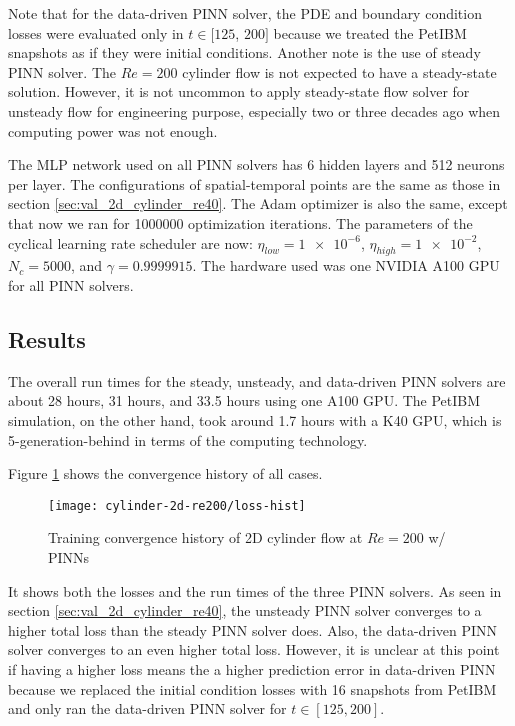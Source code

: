 Note that for the data-driven PINN solver, the PDE and boundary condition losses were evaluated only in $t\in[125$, $200]$ because we treated the PetIBM snapshots as if they were initial conditions.
Another note is the use of steady PINN solver.
The $Re=200$ cylinder flow is not expected to have a steady-state solution.
However, it is not uncommon to apply steady-state flow solver for unsteady flow for engineering purpose, especially two or three decades ago when computing power was not enough.

The MLP network used on all PINN solvers has 6 hidden layers and 512 neurons per layer.
The configurations of spatial-temporal points are the same as those in section \ref{sec:val_2d_cylinder_re40}.
The Adam optimizer is also the same, except that now we ran for \num{1000000} optimization iterations.
The parameters of the cyclical learning rate scheduler are now: $\eta_{low}=\num{1e-6}$, $\eta_{high}=\num{1e-2}$, $N_c=5000$, and $\gamma=\num{0.9999915}$.
The hardware used was one NVIDIA A100 GPU for all PINN solvers.

\subsection{Results}

The overall run times for the steady, unsteady, and data-driven PINN solvers are about 28 hours, 31 hours, and 33.5 hours using one A100 GPU.
The PetIBM simulation, on the other hand, took around 1.7 hours with a K40 GPU, which is 5-generation-behind in terms of the computing technology.

Figure \ref{fig:cylinder-re200-pinn-loss} shows the convergence history of all cases.
\begin{figure}
    \centering%
    \texttt{[image: cylinder-2d-re200/loss-hist]}%
    \caption{%
        Training convergence history of 2D cylinder flow at $Re=\num{200}$ w/ PINNs
    }
    \label{fig:cylinder-re200-pinn-loss}%
\end{figure}
It shows both the losses and the run times of the three PINN solvers.
As seen in section \ref{sec:val_2d_cylinder_re40}, the unsteady PINN solver converges to a higher total loss than the steady PINN solver does.
Also, the data-driven PINN solver converges to an even higher total loss.
However, it is unclear at this point if having a higher loss means the a higher prediction error in data-driven PINN because we replaced the initial condition losses with 16 snapshots from PetIBM and only ran the data-driven PINN solver for $t\in[125, 200]$.

